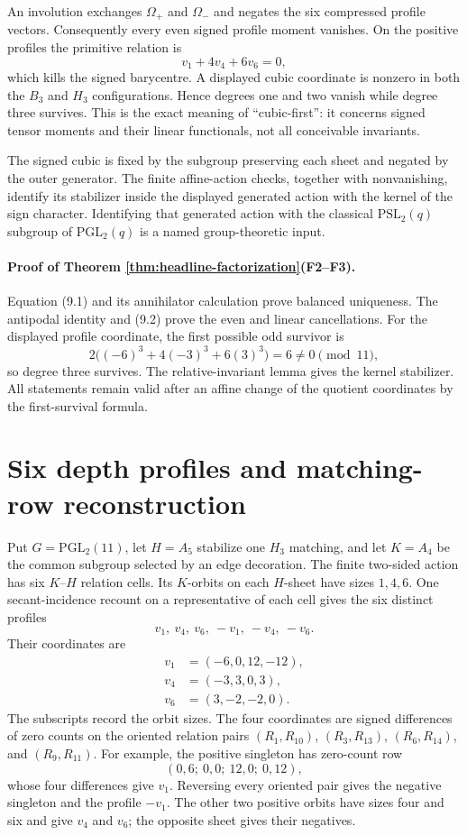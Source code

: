 \documentclass[11pt]{article}
\theoremstyle{definition}
\theoremstyle{remark}
\begin{document}
An involution exchanges $\Omega_+$ and $\Omega_-$ and negates the six
compressed profile vectors.  Consequently every even signed profile
moment vanishes.  On the positive profiles the primitive relation is
\[
 v_1+4v_4+6v_6=0,                                      \tag{9.2}
\]
which kills the signed barycentre.  A displayed cubic coordinate is
nonzero in both the $B_3$ and $H_3$ configurations.  Hence degrees one and
two vanish while degree three survives.  This is the exact meaning of
``cubic-first'': it concerns signed tensor moments and their linear
functionals, not all conceivable invariants.

The signed cubic is fixed by the subgroup preserving each sheet and
negated by the outer generator.  The finite affine-action checks, together
with nonvanishing, identify its stabilizer inside the displayed generated
action with the kernel of the sign character.  Identifying that generated
action with the classical $\mathrm{PSL}_2(q)$ subgroup of
$\mathrm{PGL}_2(q)$ is a named group-theoretic input.

\paragraph{Proof of Theorem \ref{thm:headline-factorization}(F2--F3).}
Equation (9.1) and its annihilator calculation prove balanced uniqueness.
The antipodal identity and (9.2) prove the even and linear cancellations.
For the displayed profile coordinate, the first possible odd survivor is
\[
  2\bigl((-6)^3+4(-3)^3+6(3)^3\bigr)=6\ne0\pmod {11},
\]
so degree three survives.  The relative-invariant lemma gives the kernel
stabilizer.  All statements remain valid after an affine change of the
quotient coordinates by the first-survival formula.

\section{Six depth profiles and matching-row reconstruction}
\label{sec:depth}

Put $G=\mathrm{PGL}_2(11)$, let $H=A_5$ stabilize one $H_3$ matching, and
let $K=A_4$ be the common subgroup selected by an edge decoration.  The
finite two-sided action has six $K$--$H$ relation cells.  Its $K$-orbits
on each $H$-sheet have sizes $1,4,6$.  One secant-incidence recount on a
representative of each cell gives the six distinct profiles
\[
 v_1,\ v_4,\ v_6,\ -v_1,\ -v_4,\ -v_6.                \tag{10.1}
\]
Their coordinates are
\[
\begin{aligned}
v_1&=(-6,0,12,-12),\\
v_4&=(-3,3,0,3),\\
v_6&=(3,-2,-2,0).
\end{aligned}
\]
The subscripts record the orbit sizes.  The four coordinates are signed
differences of zero counts on the oriented relation pairs
$(R_1,R_{10})$, $(R_3,R_{13})$, $(R_6,R_{14})$, and
$(R_9,R_{11})$.  For example, the positive singleton has zero-count row
\[
 (0,6;\ 0,0;\ 12,0;\ 0,12),
\]
whose four differences give $v_1$.  Reversing every oriented pair gives
the negative singleton and the profile $-v_1$.  The other two positive
orbits have sizes four and six and give $v_4$ and $v_6$; the opposite
sheet gives their negatives.
\end{document}
